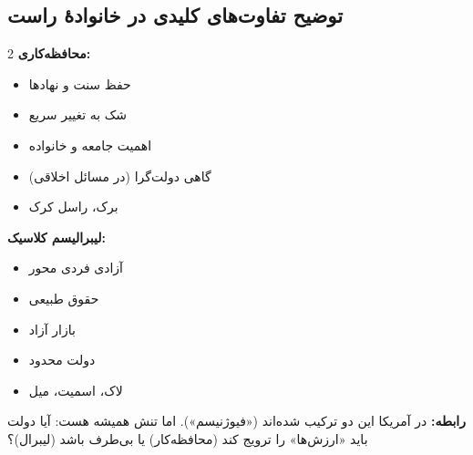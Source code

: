 \subsection*{توضیح تفاوت‌های کلیدی در خانوادهٔ راست}

\begin{tcolorbox}[
    enhanced,
    colback=rightblue!5,
    colframe=rightblue,
    boxrule=1.5pt,
    arc=5pt,
    fonttitle=\bfseries,
    title={\rl{🔵 محافظه‌کاری در برابر لیبرالیسم کلاسیک}}
]
\begin{multicols}{2}
\textbf{محافظه‌کاری:}
\begin{itemize}
    \item حفظ سنت و نهادها
    \item شک به تغییر سریع
    \item اهمیت جامعه و خانواده
    \item گاهی دولت‌گرا (در مسائل اخلاقی)
    \item برک، راسل کرک
\end{itemize}

\columnbreak

\textbf{لیبرالیسم کلاسیک:}
\begin{itemize}
    \item آزادی فردی محور
    \item حقوق طبیعی
    \item بازار آزاد
    \item دولت محدود
    \item لاک، اسمیت، میل
\end{itemize}
\end{multicols}

\textbf{رابطه:} در آمریکا این دو ترکیب شده‌اند («فیوژنیسم»). اما تنش همیشه هست: آیا دولت باید «ارزش‌ها» را ترویج کند (محافظه‌کار) یا بی‌طرف باشد (لیبرال)؟
\end{tcolorbox}


